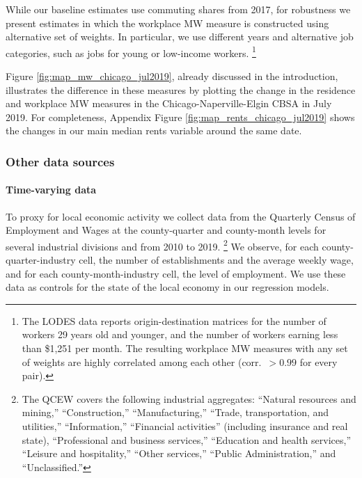 While our baseline estimates use commuting shares from 2017,
for robustness we present estimates in which the workplace MW measure
is constructed using alternative set of weights.
In particular, we use different years and alternative job categories,
such as jobs for young or low-income workers.%
\footnote{The LODES data reports origin-destination matrices for the 
number of workers 29 years old and younger, and the number of workers 
earning less than \$1,251 per month.
The resulting workplace MW measures with any set of weights are highly correlated 
among each other (corr.\ $>0.99$ for every pair).}

Figure \ref{fig:map_mw_chicago_jul2019}, already discussed in the introduction,
illustrates the difference in these measures by plotting the change in the 
residence and workplace MW measures in the Chicago-Naperville-Elgin CBSA in
July 2019.
For completeness, Appendix Figure \ref{fig:map_rents_chicago_jul2019} shows
the changes in our main median rents variable around the same date.


\subsubsection{Other data sources}\label{sec:data_other}

\paragraph{Time-varying data}

To proxy for local economic activity we collect data from the 
Quarterly Census of Employment and Wages \parencite[QCEW;][]{QCEW} 
at the county-quarter and county-month levels for several industrial divisions 
and from 2010 to 2019.%
\footnote{The QCEW covers the following industrial aggregates: 
``Natural resources and mining,'' ``Construction,'' ``Manufacturing,'' 
``Trade, transportation, and utilities,'' ``Information,'' 
``Financial activities'' (including insurance and real state), 
``Professional and business services,'' ``Education and health services,'' 
``Leisure and hospitality,'' ``Other services,'' ``Public Administration,''
and ``Unclassified.''}
We observe, for each county-quarter-industry cell, the number of establishments 
and the average weekly wage, and 
for each county-month-industry cell, the level of employment.
We use these data as controls for the state of the local economy in our 
regression models.

